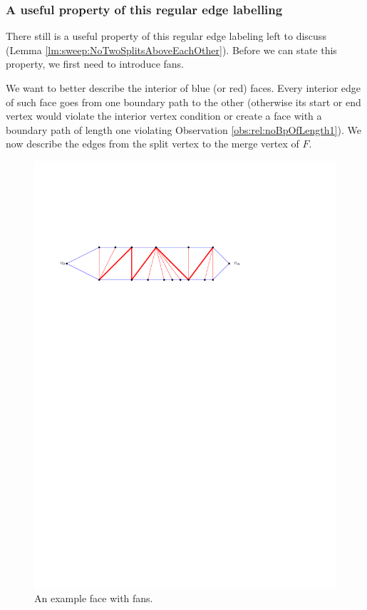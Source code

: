 \subsubsection{A useful property of this regular edge labelling}
  There still is a useful property of this regular edge labeling left to discuss (Lemma \ref{lm:sweep:NoTwoSplitsAboveEachOther}). Before we can state this property, we first need to introduce fans.

    We want to better describe the interior of blue (or red) faces. Every interior edge of such face goes from one boundary path to the other (otherwise its start or end vertex would violate the interior vertex condition or create a face with a boundary path of length one violating Observation \ref{obs:rel:noBpOfLength1}). We now describe the edges from the split vertex to the merge vertex of $F$.

    \begin{figure}[t]
      \centering
      \includegraphics[scale=.9]{rectangularDuals/img/fans}
      \caption{An example face with fans.}
      \label{fig:uni:fans}
    \end{figure}


